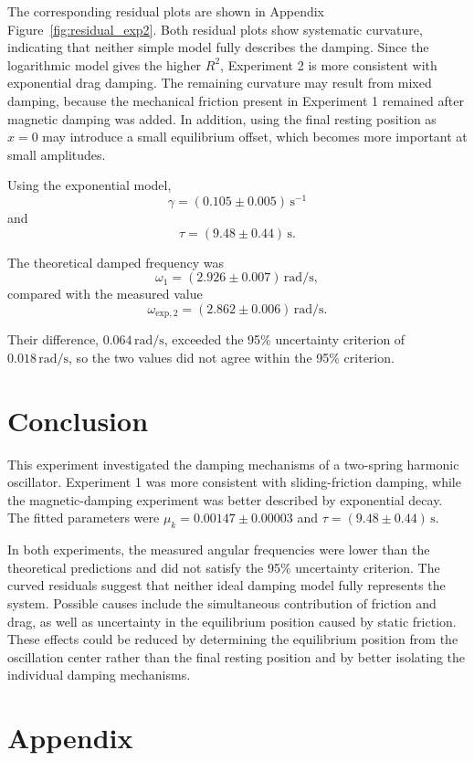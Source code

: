 \documentclass[12pt,a4paper]{article}
\begin{document}
The corresponding residual plots are shown in Appendix Figure~\ref{fig:residual_exp2}. Both residual plots show systematic curvature, indicating that neither simple model fully describes the damping. Since the logarithmic model gives the higher $R^2$, Experiment 2 is more consistent with exponential drag damping. The remaining curvature may result from mixed damping, because the mechanical friction present in Experiment 1 remained after magnetic damping was added. In addition, using the final resting position as $x=0$ may introduce a small equilibrium offset, which becomes more important at small amplitudes.

Using the exponential model,
\[
\gamma=(0.105\pm0.005)\,\mathrm{s^{-1}}
\]
and
\[
\tau=(9.48\pm0.44)\,\mathrm{s}.
\]

The theoretical damped frequency was
\[
\omega_1=(2.926\pm0.007)\,\mathrm{rad/s},
\]
compared with the measured value
\[
\omega_{\mathrm{exp},2}=(2.862\pm0.006)\,\mathrm{rad/s}.
\]

Their difference, $0.064\,\mathrm{rad/s}$, exceeded the 95\% uncertainty criterion of $0.018\,\mathrm{rad/s}$, so the two values did not agree within the 95\% criterion.


\section{Conclusion}

This experiment investigated the damping mechanisms of a two-spring harmonic oscillator. Experiment 1 was more consistent with sliding-friction damping, while the magnetic-damping experiment was better described by exponential decay. The fitted parameters were $\mu_k=0.00147\pm0.00003$ and $\tau=(9.48\pm0.44)\,\mathrm{s}$.

In both experiments, the measured angular frequencies were lower than the theoretical predictions and did not satisfy the 95\% uncertainty criterion. The curved residuals suggest that neither ideal damping model fully represents the system. Possible causes include the simultaneous contribution of friction and drag, as well as uncertainty in the equilibrium position caused by static friction. These effects could be reduced by determining the equilibrium position from the oscillation center rather than the final resting position and by better isolating the individual damping mechanisms.


\section{Appendix}
\end{document}
